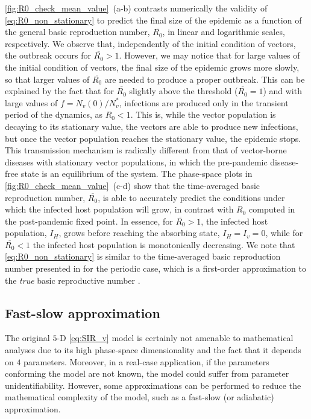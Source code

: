 \cref{fig:R0_check_mean_value}~\textcolor{ref_color}{(a-b)} contrasts
numerically the validity of
\cref{eq:R0_non_stationary} to predict the final size of the epidemic as a
function of the general basic reproduction number, $\overline{R_0}$, in linear
and logarithmic scales, respectively. We observe that, independently of the
initial condition of vectors, the outbreak occurs for $\overline{R_0}>1$.
However, we may notice that for large values of the initial condition of
vectors, the final size of the epidemic grows more slowly, so that larger
values of $\overline{R_0}$ are needed to produce a proper outbreak. This can be
explained by the fact that for $\overline{R_0}$ slightly above the threshold
($\overline{R_0}=1$) and with large values of $f=N_v(0)/N_v^*$, infections are
produced only in the transient period of the dynamics, as $R_0<1$. This is,
while the vector population is decaying to its stationary value, the vectors
are able to produce new infections, but once the vector population reaches the
stationary value, the epidemic stops. This transmission mechanism is radically
different from that of vector-borne diseases with stationary vector
populations, in which the pre-pandemic disease-free state is an equilibrium of
the system. The phase-space plots in
\cref{fig:R0_check_mean_value}~\textcolor{ref_color}{(c-d)} show
that the time-averaged basic reproduction number, $\overline{R_0}$, is able to
accurately predict the conditions under which the infected host population will
grow, in contrast with $R_0$ computed in the post-pandemic fixed point. In
essence, for $\overline{R_0}>1$, the infected host population, $I_H$, grows
before reaching the absorbing state, $I_H=I_v=0$, while for $\overline{R_0}<1$
the infected host population is monotonically decreasing. We note that
\cref{eq:R0_non_stationary} is similar to the time-averaged basic reproduction
number presented in \cite{Wesley2009} for the periodic case, which is a
first-order approximation to the \textit{true} basic reproductive number
\cite{Bacaer2006}.

\subsection{Fast-slow approximation}

The original $5$-D \cref{eq:SIR_v} model is certainly not amenable to
mathematical analyses due to its high phase-space dimensionality and the fact
that it depends on $4$ parameters. Moreover, in a real-case application, if the
parameters conforming the model are not known, the model could suffer from
parameter unidentifiability. However, some approximations can be performed to
reduce the mathematical complexity of the model, such as a fast-slow (or
adiabatic) approximation.

